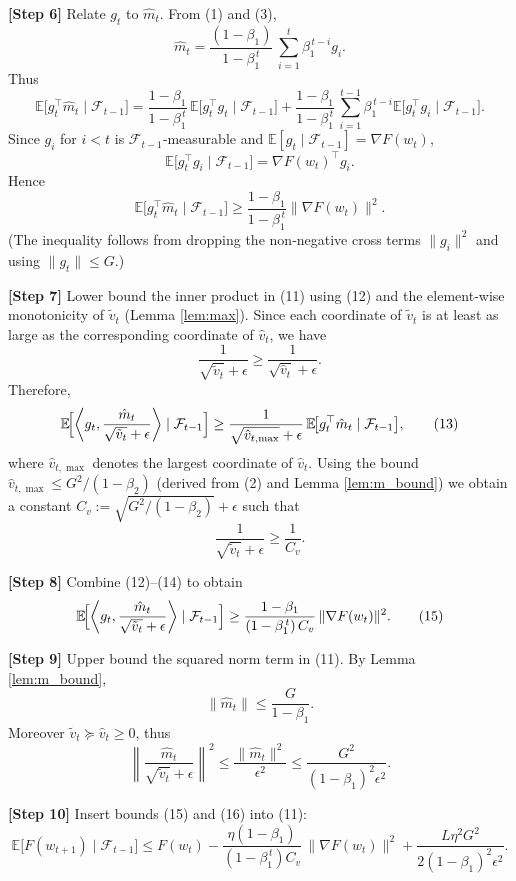 \documentclass{article}
\newcommand{\E}{\mathbb{E}}
\newcommand{\norm}[1]{\left\|#1\right\|}
\newcommand{\ip}[2]{\left\langle #1,#2\right\rangle}
\begin{document}
\noindent\textbf{[Step 6]} Relate $g_t$ to $\hat m_t$. From (1) and (3),
\[
\hat m_t = \frac{(1-\beta_1)}{1-\beta_1^{\,t}}\,\sum_{i=1}^{t}\beta_1^{\,t-i} g_i .
\]
Thus
\[
\E\!\bigl[g_t^{\top}\hat m_t\mid\mathcal{F}_{t-1}\bigr]
= \frac{1-\beta_1}{1-\beta_1^{\,t}}\,\E\!\bigl[g_t^{\top}g_t\mid\mathcal{F}_{t-1}\bigr]
+ \frac{1-\beta_1}{1-\beta_1^{\,t}}\,\sum_{i=1}^{t-1}\beta_1^{\,t-i}\E\!\bigl[g_t^{\top}g_i\mid\mathcal{F}_{t-1}\bigr].
\]
Since $g_i$ for $i<t$ is $\mathcal{F}_{t-1}$‑measurable and $\E[g_t\mid\mathcal{F}_{t-1}]=\nabla F(w_t)$,
\[
\E\!\bigl[g_t^{\top}g_i\mid\mathcal{F}_{t-1}\bigr]=\nabla F(w_t)^{\top}g_i .
\]
Hence
\[
\E\!\bigl[g_t^{\top}\hat m_t\mid\mathcal{F}_{t-1}\bigr]
\ge \frac{1-\beta_1}{1-\beta_1^{\,t}}\|\nabla F(w_t)\|^2 . \tag{12}
\]
(The inequality follows from dropping the non‑negative cross terms $\|g_i\|^2$ and using $\|g_t\|\le G$.)

\noindent\textbf{[Step 7]} Lower bound the inner product in (11) using (12) and the element‑wise monotonicity of $\tilde v_t$ (Lemma \ref{lem:max}). Since each coordinate of $\tilde v_t$ is at least as large as the corresponding coordinate of $\hat v_t$, we have
\[
\frac{1}{\sqrt{\tilde v_t}+\epsilon}
\ge \frac{1}{\sqrt{\hat v_t}+\epsilon}.
\]
Therefore,
\[
\E\!\Bigl[\ip{g_t}{\frac{\hat m_t}{\sqrt{\tilde v_t}+\epsilon}}\mid\mathcal{F}_{t-1}\Bigr]
\ge \frac{1}{\sqrt{\hat v_{t,\max}}+\epsilon}\,\E\!\bigl[g_t^{\top}\hat m_t\mid\mathcal{F}_{t-1}\bigr], \tag{13}
\]
where $\hat v_{t,\max}$ denotes the largest coordinate of $\hat v_t$. Using the bound $\hat v_{t,\max}\le G^2/(1-\beta_2)$ (derived from (2) and Lemma \ref{lem:m_bound}) we obtain a constant $C_v:=\sqrt{G^2/(1-\beta_2)}+\epsilon$ such that
\[
\frac{1}{\sqrt{\tilde v_t}+\epsilon}\ge \frac{1}{C_v}. \tag{14}
\]

\noindent\textbf{[Step 8]} Combine (12)–(14) to obtain
\[
\E\!\Bigl[\ip{g_t}{\frac{\hat m_t}{\sqrt{\tilde v_t}+\epsilon}}\mid\mathcal{F}_{t-1}\Bigr]
\ge \frac{1-\beta_1}{(1-\beta_1^{\,t})\,C_v}\,\|\nabla F(w_t)\|^2 . \tag{15}
\]

\noindent\textbf{[Step 9]} Upper bound the squared norm term in (11). By Lemma \ref{lem:m_bound},
\[
\|\hat m_t\|\le \frac{G}{1-\beta_1}.
\]
Moreover $\tilde v_t\succeq \hat v_t\ge 0$, thus
\[
\norm{\frac{\hat m_t}{\sqrt{\tilde v_t}+\epsilon}}^2
\le \frac{\|\hat m_t\|^2}{\epsilon^2}
\le \frac{G^2}{(1-\beta_1)^2\epsilon^2}. \tag{16}
\]

\noindent\textbf{[Step 10]} Insert bounds (15) and (16) into (11):
\[
\E\!\bigl[F(w_{t+1})\mid\mathcal{F}_{t-1}\bigr]
\le F(w_t)
- \frac{\eta(1-\beta_1)}{(1-\beta_1^{\,t})C_v}\,\|\nabla F(w_t)\|^2
+ \frac{L\eta^2 G^2}{2(1-\beta_1)^2\epsilon^2}. \tag{17}
\]
\end{document}
